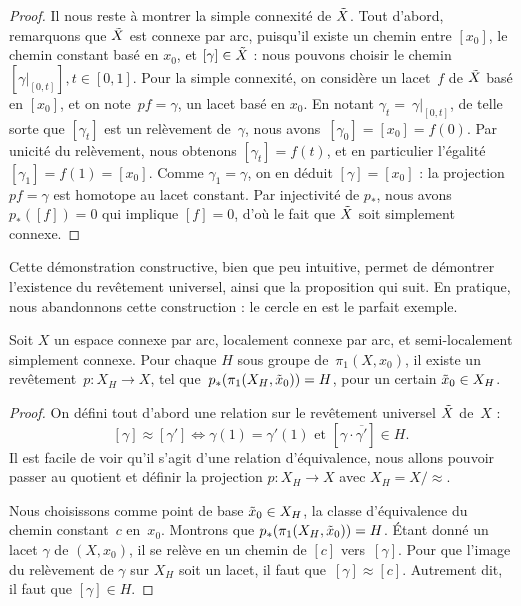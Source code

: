 \begin{proof}
\bigskip Il nous reste à montrer la simple connexité de $\Tilde{X}$. Tout d'abord, remarquons que $\Tilde{X}$ est connexe par arc, puisqu'il existe un chemin entre $[x_0]$, le chemin constant basé en $x_0$, et $[\gamma]\in \Tilde{X}$ : nous pouvons choisir le chemin~$[\gamma|_{[0,t]}], t\in[0,1]$. Pour la simple connexité, on considère un lacet~$f$ de $\Tilde{X}$ basé en $[x_0]$, et on note~$pf=\gamma$, un lacet basé en $x_0$. En notant $\gamma_t=~\gamma|_{[0,t]}$, de telle sorte que $[\gamma_t]$ est un relèvement de~$\gamma$, nous avons~$[\gamma_0]=[x_0]=f(0)$. Par unicité du relèvement, nous obtenons $[\gamma_t]=f(t)$, et en particulier l'égalité~$[\gamma_1]=f(1)=[x_0]$. Comme $\gamma_1=\gamma$, on en déduit $[\gamma]=[x_0]$ : la projection $pf=\gamma$ est homotope au lacet constant. Par injectivité de $p_\ast$, nous avons~$p_\ast([f])=0$ qui implique $[f]=0$, d'où le fait que $\Tilde{X}$ soit simplement connexe.
\end{proof}

Cette démonstration constructive, bien que peu intuitive, permet de démontrer l'existence du revêtement universel, ainsi que la proposition qui suit. En pratique, nous abandonnons cette construction : le cercle en est le parfait exemple.

\begin{proposition}
Soit $X$ un espace connexe par arc, localement connexe par arc, et semi-localement simplement connexe. Pour chaque $H$ sous groupe de~$\pi_1(X,x_0)$, il existe un revêtement~${p:X_H\to X}$, tel que~$p_\ast(\pi_1(X_H,\Tilde{x}_0))=H$, pour un certain $\Tilde{x}_0\in X_H$.
\end{proposition}
\begin{proof}
On défini tout d'abord une relation sur le revêtement universel $\Tilde{X}$ de~$X$ : \[[\gamma]\approx[\gamma']\Longleftrightarrow\gamma(1)=\gamma'(1)\text{ et }[\gamma\cdot\overline{\gamma'}]\in H.\]Il est facile de voir qu'il s'agit d'une relation d'équivalence, nous allons pouvoir passer au quotient et définir la projection $p:X_H\to X$ avec $X_H=X/\approx$.

Nous choisissons comme point de base $\Tilde{x}_0\in X_H$, la classe d'équivalence du chemin constant~$c$ en~$x_0$. Montrons que $p_\ast(\pi_1(X_H,\Tilde{x}_0))=H$. Étant donné un lacet $\gamma$ de $(X,x_0)$, il se relève en un chemin de $[c]$ vers~$[\gamma]$. Pour que l'image du relèvement de $\gamma$ sur $X_H$ soit un lacet, il faut que~$[\gamma]\approx[c]$. Autrement dit, il faut que $[\gamma]\in H$.
\end{proof}

